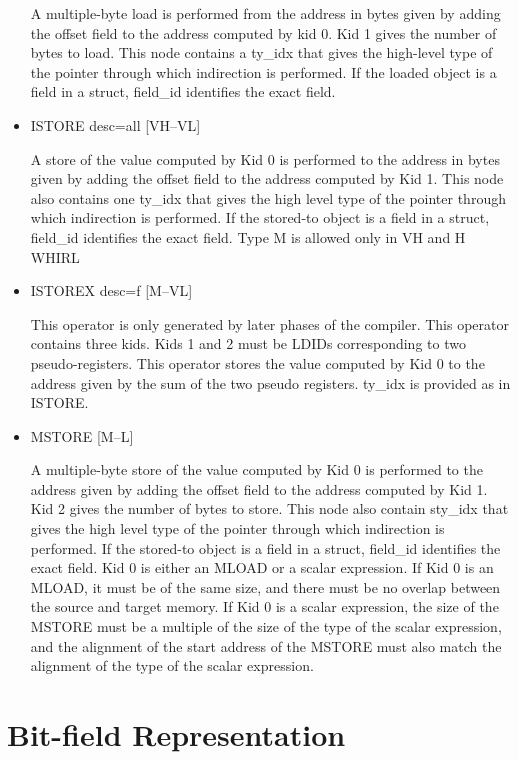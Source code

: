 \documentclass{article}
\begin{document}
\begin{itemize}
A multiple-byte load is performed from the address in bytes given
by adding the offset field to the address computed by kid 0. Kid 1
gives the number of bytes to load. This node contains a ty\_idx that gives the
high-level type of the pointer through which indirection is performed.
If the loaded object is a field in a struct, field\_id identifies
the exact field. 

\item
{}%
ISTORE desc=all \hfill [VH--VL]

A store of the value computed by Kid 0 is performed to the address
in bytes given by adding the offset field to the address computed
by Kid 1.
This node also contains one ty\_idx that gives the high level type
of the pointer through which indirection is performed. If the
stored-to object is a field in a struct, field\_id identifies the
exact field. Type M is allowed only in VH and H WHIRL

\item
{}%
ISTOREX desc=f \hfill [M--VL]

This operator is only generated by later phases of the compiler.
This operator contains three kids. Kids 1 and 2 must be
%
LDIDs corresponding to two pseudo-registers. This operator stores
the value computed by Kid 0
to the address given by the sum of the two pseudo registers. ty\_idx
is provided as in
%
ISTORE.

\item
{}%
MSTORE \hfill [M--L]

A multiple-byte store of the value computed by Kid 0 is performed
to the address given by adding the offset field to the address
computed by Kid
1. Kid 2 gives the number of bytes to store. This node also
contain sty\_idx that gives the high level type of the pointer through
which indirection is performed. If the stored-to object is a field
in a struct, field\_id identifies the exact field. Kid 0 is either
an
%
MLOAD or a scalar expression. If Kid 0 is an
%
MLOAD, it must be of
the same size, and there must be no overlap between the source and
target memory. If Kid 0 is a scalar expression, the size of the
%
MSTORE must be a multiple of the size of the type of the scalar
expression, and the alignment of the start address of the
%
MSTORE
must also match the alignment of the type of the scalar expression.

\end{itemize}
\section{Bit-field Representation}
\end{document}
